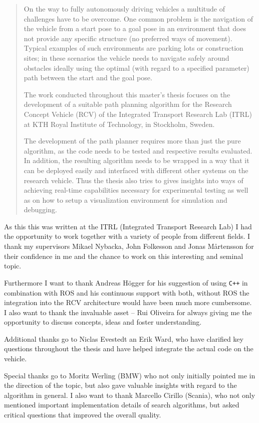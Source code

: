 \begin{abstract}
On the way to fully autonomously driving vehicles a multitude of challenges have to be overcome. One common problem is the navigation of the vehicle from a start pose to a goal pose in an environment that does not provide any specific structure (no preferred ways of movement). Typical examples of such environments are parking lots or construction sites; in these scenarios the vehicle needs to navigate safely around obstacles ideally using the optimal (with regard to a specified parameter) path between the start and the goal pose.

The work conducted throughout this master's thesis focuses on the development of a suitable path planning algorithm for the Research Concept Vehicle (RCV) of the Integrated Transport Research Lab (ITRL) at KTH Royal Institute of Technology, in Stockholm, Sweden.

The development of the path planner requires more than just the pure algorithm, as the code needs to be tested and respective results evaluated. In addition, the resulting algorithm needs to be wrapped in a way that it can be deployed easily and interfaced with different other systems on the research vehicle. Thus the thesis also tries to gives insights into ways of achieving real-time capabilities necessary for experimental testing as well as on how to setup a visualization environment for simulation and debugging.
\end{abstract}

\begin{acknowledgements}
As this this was written at the ITRL (Integrated Transport Research Lab) I had the opportunity to work together with a variety of people from different fields. I thank my supervisors Mikael Nybacka, John Folkesson and Jonas Mårtensson for their confidence in me and the chance to work on this interesting and seminal topic.

Furthermore I want to thank Andreas Högger for his suggestion of using \texttt{C++} in combination with ROS and his continuous support with both, without ROS the integration into the RCV architecture would have been much more cumbersome. I also want to thank the invaluable asset -- Rui Oliveira for always giving me the opportunity to discuss concepts, ideas and foster understanding.

Additional thanks go to Niclas Evestedt an Erik Ward, who have clarified key questions throughout the thesis and have helped integrate the actual code on the vehicle.

Special thanks go to Moritz Werling (BMW) who not only initially pointed me in the direction of the topic, but also gave valuable insights with regard to the algorithm in general. I also want to thank Marcello Cirillo (Scania), who not only mentioned important implementation details of search algorithms, but asked critical questions that improved the overall quality.
\end{acknowledgements}